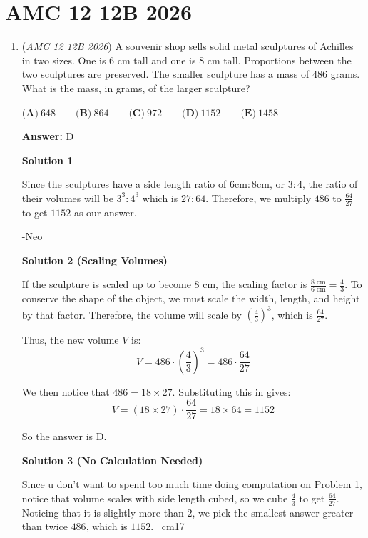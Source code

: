 \section{AMC 12 12B 2026}
        \begin{enumerate}
        	\item (\textit{AMC 12 12B 2026}) A souvenir shop sells solid metal sculptures of Achilles in two sizes. One is $6$ cm tall and one is $8$ cm tall. Proportions between the two sculptures are preserved. The smaller sculpture has a mass of $486$ grams. What is the mass, in grams, of the larger sculpture?


 $\textbf{(A)}\   648  \qquad                 \textbf{(B)}\   864  \qquad                 \textbf{(C)}\   972  \qquad                 \textbf{(D)}\   1152  \qquad                 \textbf{(E)}\   1458$

 \textbf{Answer: }D



\textbf{Solution 1}

Since the sculptures have a side length ratio of \(6\text{cm}:8\text{cm}\), or \(3:4\), the ratio of their volumes will be \(3^3:4^3\) which is \(27:64\). Therefore, we multiply \(486\) to \(\frac{64}{27}\) to get $\boxed{1152}$ as our answer. 

 -Neo

 



\textbf{Solution 2 (Scaling Volumes)}

If the sculpture is scaled up to become $8\text{ cm}$, the scaling factor is $\frac{8\text{ cm}}{6\text{ cm}} = \frac{4}{3}$. To conserve the shape of the object, we must scale the width, length, and height by that factor. Therefore, the volume will scale by $\left(\frac{4}{3}\right)^3$, which is $\frac{64}{27}$. 

 Thus, the new volume $V$ is:
 \[V = 486 \cdot \left(\frac{4}{3}\right)^3 = 486 \cdot \frac{64}{27}\]

 We then notice that $486 = 18 \times 27$. Substituting this in gives:
 \[V = (18 \times 27) \cdot \frac{64}{27} = 18 \times 64 = \boxed{1152}\]

 So the answer is $\boxed{\text{D}}$.

 



\textbf{Solution 3 (No Calculation Needed)}

Since u don't want to spend too much time doing computation on Problem 1, notice that volume scales with side length cubed, so we cube  \(\frac{4}{3}\) to get \(\frac{64}{27}\). Noticing that it is slightly more than \(2\), we pick the smallest answer greater than twice \(486\), which is $\boxed{1152}$. ~cm17


\end{enumerate}
